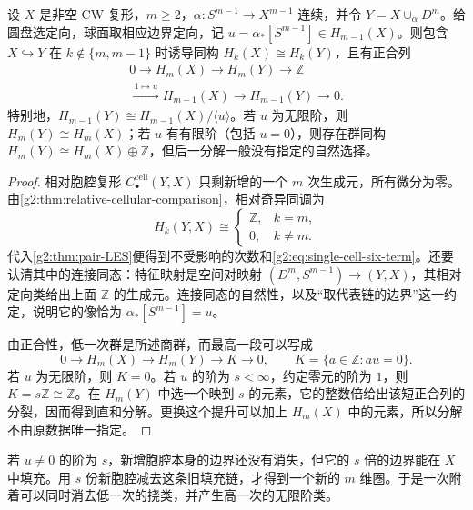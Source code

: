 \begin{proposition}\label{g2:prop:single-cell-homology-change}
	设 \(X\) 是非空 CW 复形，\(m\geq2\)，\(\alpha:S^{m-1}\to X^{m-1}\) 连续，并令 \(Y=X\cup_\alpha D^m\)。给圆盘选定向，球面取相应边界定向，记 \(u=\alpha_*[S^{m-1}]\in H_{m-1}(X)\)。则包含 \(X\hookrightarrow Y\) 在 \(k\notin\{m,m-1\}\) 时诱导同构 \(H_k(X)\cong H_k(Y)\)，且有正合列
	\begin{equation}\label{g2:eq:single-cell-six-term}
		\begin{gathered}
			0\longrightarrow H_m(X)\longrightarrow H_m(Y)\longrightarrow\mathbb Z\\
			\xrightarrow{\,1\mapsto u\,}H_{m-1}(X)\longrightarrow H_{m-1}(Y)\longrightarrow0.
		\end{gathered}
	\end{equation}
	特别地，\(H_{m-1}(Y)\cong H_{m-1}(X)/\langle u\rangle\)。若 \(u\) 为无限阶，则 \(H_m(Y)\cong H_m(X)\)；若 \(u\) 有有限阶（包括 \(u=0\)），则存在群同构 \(H_m(Y)\cong H_m(X)\oplus\mathbb Z\)，但后一分解一般没有指定的自然选择。
\end{proposition}
\begin{proof}
	相对胞腔复形 \(C^{\mathrm{cell}}_\bullet(Y,X)\) 只剩新增的一个 \(m\) 次生成元，所有微分为零。由\cref{g2:thm:relative-cellular-comparison}，相对奇异同调为
	\[
		H_k(Y,X)\cong
		\begin{cases}
			\mathbb Z,&k=m,\\
			0,&k\ne m.
		\end{cases}
	\]
	代入\cref{g2:thm:pair-LES}便得到不受影响的次数和\eqref{g2:eq:single-cell-six-term}。还要认清其中的连接同态：特征映射是空间对映射 \((D^m,S^{m-1})\to(Y,X)\)，其相对定向类给出上面 \(\mathbb Z\) 的生成元。连接同态的自然性，以及“取代表链的边界”这一约定，说明它的像恰为 \(\alpha_*[S^{m-1}]=u\)。

	由正合性，低一次群是所述商群，而最高一段可以写成
	\[
		0\longrightarrow H_m(X)\longrightarrow H_m(Y)
		\longrightarrow K\longrightarrow0,
		\qquad K=\{a\in\mathbb Z:au=0\}.
	\]
	若 \(u\) 为无限阶，则 \(K=0\)。若 \(u\) 的阶为 \(s<\infty\)，约定零元的阶为 \(1\)，则 \(K=s\mathbb Z\cong\mathbb Z\)。在 \(H_m(Y)\) 中选一个映到 \(s\) 的元素，它的整数倍给出该短正合列的分裂，因而得到直和分解。更换这个提升可以加上 \(H_m(X)\) 中的元素，所以分解不由原数据唯一指定。
\end{proof}

若 \(u\ne0\) 的阶为 \(s\)，新增胞腔本身的边界还没有消失，但它的 \(s\) 倍的边界能在 \(X\) 中填充。用 \(s\) 份新胞腔减去这条旧填充链，才得到一个新的 \(m\) 维圈。于是一次附着可以同时消去低一次的挠类，并产生高一次的无限阶类。

